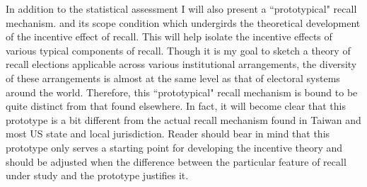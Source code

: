 \documentclass[hyphens, crop=false]{standalone}
\begin{document}
	In addition to the statistical assessment
	I will 
	also present a ``prototypical" recall mechanism.
	and its scope condition which undergirds the theoretical development of the incentive effect of recall.
	This will help isolate the incentive effects of various typical components of recall.
	Though it is my goal to
	sketch a theory of recall elections applicable across various institutional arrangements,
	the diversity of these arrangements is almost at the same level as that of electoral systems around the world.
	Therefore, this ``prototypical" recall mechanism is bound to be quite distinct from that found elsewhere.
	In fact, it will become clear that this prototype is a bit different from the actual recall mechanism found in Taiwan and most US state and local jurisdiction.
	Reader should bear in mind that this prototype only serves a starting point for developing the incentive theory and should be adjusted when the difference between the particular feature of recall under study and the prototype justifies it.
	
	
	
\end{document}
